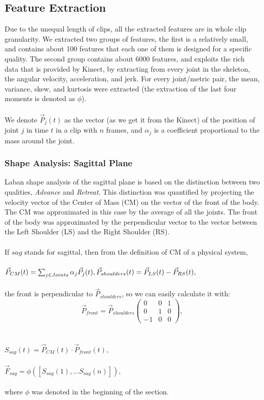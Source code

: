 \documentclass[11pt,twocolumn,varwidth=true,a4paper,fleqn]{article}
\begin{document}
\subsection{Feature Extraction}
Due to the unequal length of clips, all the extracted features are in whole clip 
granularity. We extracted two groups of features, the first is a relatively
small, and contains about 100 features that each one of them is designed for a
specific quality. The second group contains about 6000 features, and exploits the rich data that
is provided by Kinect, by extracting from every joint in the skeleton, the
angular velocity, acceleration, and jerk. For every joint/metric pair, the mean,
variance, skew, and kurtosis were extracted (the extraction of the last four moments is denoted as $\phi$).
\\\\We denote $\vec{P}_{j}(t)$ as the vector (as we get it from the Kinect) of
the position of joint $j$ in time $t$ in a clip with $n$ frames, and
$\alpha_{j}$ is a coefficient proportional to the mass around the joint.
\subsubsection{Shape Analysis: Sagittal Plane}
Laban shape analysis of the sagittal plane is based on the distinction
between two qualities, \textit{Advance} and \textit{Retreat}. This distinction was quantified by projecting the 
velocity vector of the Center of Mass (CM) on the vector of the front of the
body.
The CM was approximated in this case by the average of all the joints. 
The front of the body was approximated by the perpendicular vector to the vector 
between the Left Shoulder (LS) and
the Right Shoulder (RS).
\\\\If $sag$ stands for sagittal, then from the definition of CM of a physical
system,
\\
\\$\vec{P}_{CM}(t) = \sum_{j \in Joints} \alpha_{j}\vec{P}_{j}(t),
\\
\\\vec{P}_{shoulders}(t)=\vec{P}_{LS}(t)-\vec{P}_{RS}(t),$
\\\\the front is perpendicular to $\vec{P}_{shoulders}$, so we can easily calculate it with:
\\\[\vec{P}_{front}=\vec{P}_{shoulders}\left( \begin{array}{ccc}
0 & 0 & 1 \\
0 & 1 & 0 \\
-1 & 0 & 0 \end{array} \right),\]
\\\\$S_{sag}(t) = \vec{P}_{CM}(t)\cdot\vec{P}_{front}(t),$ 
\\\\$\vec{F}_{sag} = \phi([S_{sag}(1), \ldots S_{sag}(n)]),$
\\\\where $\phi$ was denoted in the beginning of the section.
\end{document}
